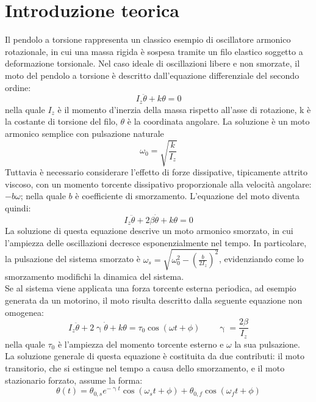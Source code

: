 \documentclass{article}
\begin{document}
\section{Introduzione teorica}
Il pendolo a torsione rappresenta un classico esempio di oscillatore armonico rotazionale, in cui una massa rigida è sospesa tramite un filo elastico soggetto a deformazione torsionale. Nel caso ideale di oscillazioni libere e non smorzate, il moto del pendolo a torsione è descritto dall’equazione differenziale del secondo ordine:
\begin{equation*}
    I_z \ddot{\theta} + k \theta = 0
\end{equation*}
 nella quale $I_z$ è il momento d’inerzia della massa rispetto all’asse di rotazione,
k è la costante di torsione del filo, $\theta$ è la coordinata angolare. La soluzione è un moto armonico semplice con pulsazione naturale 
\begin{equation*}
    \omega_0 = \sqrt{\frac{k}{I_z}}
\end{equation*}
Tuttavia è necessario considerare l’effetto di forze dissipative, tipicamente attrito viscoso, con un momento torcente dissipativo proporzionale alla velocità angolare: $-b\omega$; nella quale $b$ è coefficiente di smorzamento. L’equazione del moto diventa quindi:
\begin{equation*}
    I_z \ddot{\theta} + 2\beta \dot{\theta} + k \theta = 0
\end{equation*}
La soluzione di questa equazione descrive un moto armonico smorzato, in cui l’ampiezza delle oscillazioni decresce esponenzialmente nel tempo. In particolare, la pulsazione del sistema smorzato è $\omega_s=\sqrt{\omega_0^2-(\frac{b}{2I_z})^2}$, evidenziando come lo smorzamento modifichi la dinamica del sistema.\\
Se al sistema viene applicata una forza torcente esterna periodica, ad esempio generata da un motorino, il moto risulta descritto dalla seguente equazione non omogenea:
\begin{equation}
    I_z \ddot{\theta} + 2\upgamma \dot{\theta} + k \theta = \tau_0 \cos(\omega t+\phi)\qquad \upgamma=\frac{2\beta}{I_z}
\end{equation}
 nella quale $\tau_0$ è l’ampiezza del momento torcente esterno e $\omega$ la sua pulsazione. La soluzione generale di questa equazione è costituita da due contributi: il moto transitorio, che si estingue nel tempo a causa dello smorzamento, e il moto stazionario forzato, assume la forma:
\begin{equation}
    \theta(t) = \theta_{0,s} e^{-\upgamma t} \cos(\omega_{s} t +\phi)+ \theta_{0,f}\cos(\omega_{f} t + \phi)
\end{equation}
\end{document}
